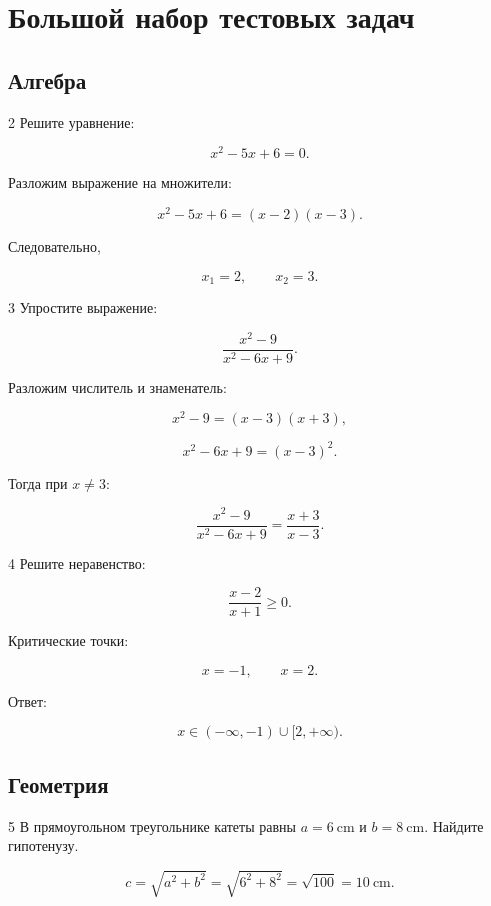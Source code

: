 \documentclass[12pt,a4paper]{article}
\theoremstyle{definition}
\theoremstyle{remark}
\begin{document}
\section{Большой набор тестовых задач}

\subsection{Алгебра}

\begin{taskbox}{2}
Решите уравнение:

\[
    x^2-5x+6=0.
\]

Разложим выражение на множители:

\[
    x^2-5x+6
    =
    (x-2)(x-3).
\]

Следовательно,

\[
    x_1=2,
    \qquad
    x_2=3.
\]
\end{taskbox}

\begin{taskbox}{3}
Упростите выражение:

\[
    \frac{x^2-9}{x^2-6x+9}.
\]

Разложим числитель и знаменатель:

\[
    x^2-9=(x-3)(x+3),
\]

\[
    x^2-6x+9=(x-3)^2.
\]

Тогда при $x\neq3$:

\[
    \frac{x^2-9}{x^2-6x+9}
    =
    \frac{x+3}{x-3}.
\]
\end{taskbox}

\begin{taskbox}{4}
Решите неравенство:

\[
    \frac{x-2}{x+1}\geq0.
\]

Критические точки:

\[
    x=-1,
    \qquad
    x=2.
\]

Ответ:

\[
    x\in(-\infty,-1)\cup[2,+\infty).
\]
\end{taskbox}

\subsection{Геометрия}

\begin{taskbox}{5}
В прямоугольном треугольнике катеты равны
$a=\SI{6}{\centi\meter}$ и $b=\SI{8}{\centi\meter}$.
Найдите гипотенузу.

\[
    c
    =
    \sqrt{a^2+b^2}
    =
    \sqrt{6^2+8^2}
    =
    \sqrt{100}
    =
    \SI{10}{\centi\meter}.
\]
\end{taskbox}
\end{document}
